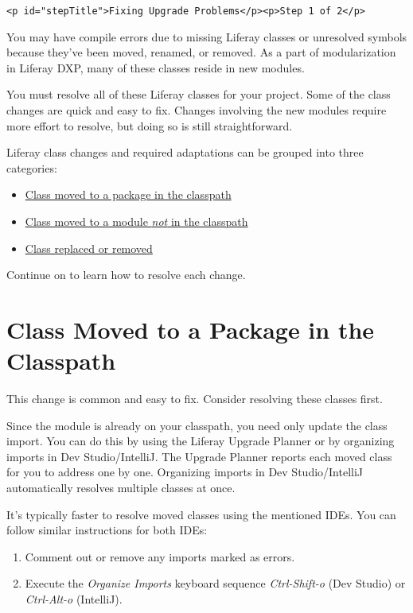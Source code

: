 \begin{verbatim}
<p id="stepTitle">Fixing Upgrade Problems</p><p>Step 1 of 2</p>
\end{verbatim}

You may have compile errors due to missing Liferay classes or unresolved
symbols because they've been moved, renamed, or removed. As a part of
modularization in Liferay DXP, many of these classes reside in new
modules.

You must resolve all of these Liferay classes for your project. Some of
the class changes are quick and easy to fix. Changes involving the new
modules require more effort to resolve, but doing so is still
straightforward.

Liferay class changes and required adaptations can be grouped into three
categories:

\begin{itemize}
\item
  \hyperref[class-moved-to-a-package-in-the-classpath]{Class moved to a
  package in the classpath}
\item
  \hyperref[class-moved-to-a-module-not-in-the-classpath]{Class moved to
  a module \emph{not} in the classpath}
\item
  \hyperref[class-replaced-or-removed]{Class replaced or removed}
\end{itemize}

Continue on to learn how to resolve each change.

\section{Class Moved to a Package in the
Classpath}\label{class-moved-to-a-package-in-the-classpath}

This change is common and easy to fix. Consider resolving these classes
first.

Since the module is already on your classpath, you need only update the
class import. You can do this by using the Liferay Upgrade Planner or by
organizing imports in Dev Studio/IntelliJ. The Upgrade Planner reports
each moved class for you to address one by one. Organizing imports in
Dev Studio/IntelliJ automatically resolves multiple classes at once.

It's typically faster to resolve moved classes using the mentioned IDEs.
You can follow similar instructions for both IDEs:

\begin{enumerate}
\def\labelenumi{\arabic{enumi}.}
\item
  Comment out or remove any imports marked as errors.
\item
  Execute the \emph{Organize Imports} keyboard sequence
  \emph{Ctrl-Shift-o} (Dev Studio) or \emph{Ctrl-Alt-o} (IntelliJ).
\end{enumerate}


